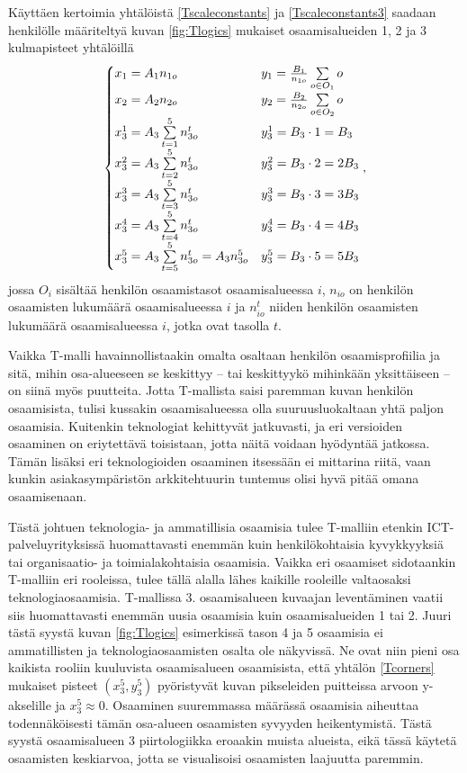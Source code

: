 \documentclass[a4paper,finnish,12pt]{article}
\begin{document}
Käyttäen kertoimia yhtälöistä \eqref{Tscaleconstants} ja \eqref{Tscaleconstants3} saadaan henkilölle määriteltyä kuvan \ref{fig:Tlogics} mukaiset osaamisalueiden 1, 2 ja 3 kulmapisteet yhtälöillä
\begin{equation}
\begin{cases}
x_1 = A_1 n_{1o} & y_1 = \frac{B_1}{n_{1o}} \sum\limits_{o \in O_1} o \\
x_2 = A_2 n_{2o} & y_2 = \frac{B_2}{n_{2o}} \sum\limits_{o \in O_2} o \\
x_3^1 = A_3 \sum\limits_{t = 1}^{5} n_{3o}^t & y_3^1 = B_3 \cdot 1 = B_3 \\
x_3^2 = A_3 \sum\limits_{t = 2}^{5} n_{3o}^t & y_3^2 = B_3 \cdot 2 = 2 B_3 \\
x_3^3 = A_3 \sum\limits_{t = 3}^{5} n_{3o}^t & y_3^3 = B_3 \cdot 3 = 3 B_3 \\
x_3^4 = A_3 \sum\limits_{t = 4}^{5} n_{3o}^t & y_3^4= B_3 \cdot 4 = 4 B_3 \\
x_3^5 = A_3 \sum\limits_{t = 5}^{5} n_{3o}^t = A_3 n_{3o}^5 & y_3^5 = B_3 \cdot 5 = 5 B_3
\end{cases} \\ ,
\label{Tcorners}
\end{equation} jossa $O_i$ sisältää henkilön osaamistasot osaamisalueessa $i$, $n_{io}$ on henkilön osaamisten lukumäärä osaamisalueessa $i$ ja $n_{io}^t$ niiden henkilön osaamisten lukumäärä osaamisalueessa $i$, jotka ovat tasolla $t$.

Vaikka T-malli havainnollistaakin omalta osaltaan henkilön osaamisprofiilia ja sitä, mihin osa-alueeseen se keskittyy -- tai keskittyykö mihinkään yksittäiseen -- on siinä myös puutteita. Jotta T-mallista saisi paremman kuvan henkilön osaamisista, tulisi kussakin osaamisalueessa olla suuruusluokaltaan yhtä paljon osaamisia. Kuitenkin teknologiat kehittyvät jatkuvasti, ja eri versioiden osaaminen on eriytettävä toisistaan, jotta näitä voidaan hyödyntää jatkossa. Tämän lisäksi eri teknologioiden osaaminen itsessään ei mittarina riitä, vaan kunkin asiakasympäristön arkkitehtuurin tuntemus olisi hyvä pitää omana osaamisenaan.

Tästä johtuen teknologia- ja ammatillisia osaamisia tulee T-malliin etenkin ICT-palveluyrityksissä huomattavasti enemmän kuin henkilökohtaisia kyvykkyyksiä tai organisaatio- ja toimialakohtaisia osaamisia. Vaikka eri osaamiset sidotaankin T-malliin eri rooleissa, tulee tällä alalla lähes kaikille rooleille valtaosaksi teknologiaosaamisia. T-mallissa 3. osaamisalueen kuvaajan leventäminen vaatii siis huomattavasti enemmän uusia osaamisia kuin osaamisalueiden 1 tai 2. Juuri tästä syystä kuvan \ref{fig:Tlogics} esimerkissä tason 4 ja 5 osaamisia ei ammatillisten ja teknologiaosaamisten osalta ole näkyvissä. Ne ovat niin pieni osa kaikista rooliin kuuluvista osaamisalueen osaamisista, että yhtälön \eqref{Tcorners} mukaiset pisteet $(x_3^5, y_3^5)$ pyöristyvät kuvan pikseleiden puitteissa arvoon y-akselille ja $x_3^5 \approx 0$. Osaaminen suuremmassa määrässä osaamisia aiheuttaa todennäköisesti tämän osa-alueen osaamisten syvyyden heikentymistä. Tästä syystä osaamisalueen 3 piirtologiikka eroaakin muista alueista, eikä tässä käytetä osaamisten keskiarvoa, jotta se visualisoisi osaamisten laajuutta paremmin.
\end{document}
